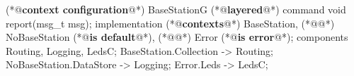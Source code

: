 \begin{Sbox}
\begin{minipage}{\columnwidth}
\begin{csource}
(*@\textbf{context configuration}@*) BaseStationG {
 (*@\textbf{layered}@*) command void report(msg_t msg);
}implementation {
 (*@\textbf{contexts}@*) BaseStation,
 (*@@*) NoBaseStation (*@\textbf{is default}@*),
 (*@@*) Error (*@\textbf{is error}@*);
 components Routing, Logging, LedsC;
 BaseStation.Collection -> Routing;
 NoBaseStation.DataStore -> Logging;
 Error.Leds -> LedsC;}
\end{csource}
\end{minipage}
\end{Sbox}